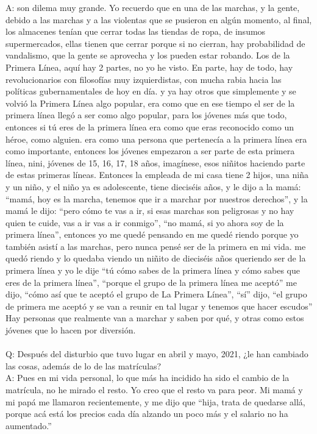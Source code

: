 \documentclass{phyasgn}\usepackage{nag}
\begin{document}
A: son dilema muy grande. Yo recuerdo que en una de las marchas, y la gente, debido a las marchas y a las violentas que se pusieron en algún momento, al final, los almacenes tenían que cerrar todas las tiendas de ropa, de insumos supermercados, ellas tienen que cerrar porque si no cierran, hay probabilidad de vandalismo, que la gente se aprovecha y los pueden estar robando. Los de la Primera Línea, aquí hay 2 partes, no yo he visto. En parte, hay de todo, hay revolucionarios con filosofías muy izquierdistas, con mucha rabia hacia las políticas gubernamentales de hoy en día. y ya hay otros que simplemente y se volvió la Primera Línea algo popular, era como que en ese tiempo el ser de la primera línea llegó a ser como algo popular, para los jóvenes más que todo, entonces si tú eres de la primera línea era como que eras reconocido como un héroe, como alguien. era como una persona que pertenecía a la primera línea era como importante, entonces los jóvenes empezaron a ser parte de esta primera línea, nini, jóvenes de 15, 16, 17, 18 años, imagínese, esos niñitos haciendo parte de estas primeras líneas. Entonces la empleada de mi casa tiene 2 hijos, una niña y un niño, y el niño ya es adolescente, tiene dieciséis años, y le dijo a la mamá: “mamá, hoy es la marcha, tenemos que ir a marchar por nuestros derechos”, y la mamá le dijo: “pero cómo te vas a ir, si esas marchas son peligrosas y no hay quien te cuide, vas a ir vas a ir conmigo”, “no mamá, si yo ahora soy de la primera línea”, entonces yo me quedé pensando en me quedé riendo porque yo también asistí a las marchas, pero nunca pensé ser de la primera en mi vida. me quedó riendo y lo quedaba viendo un niñito de dieciséis años queriendo ser de la primera línea y yo le dije “tú cómo sabes de la primera línea y cómo sabes que eres de la primera línea”, “porque el grupo de la primera línea me aceptó” me dijo, “cómo así que te aceptó el grupo de La Primera Línea”, “sí” dijo, “el grupo de primera me aceptó y se van a reunir en tal lugar y tenemos que hacer escudos” Hay personas que realmente van a marchar y saben por qué, y otras como estos jóvenes que lo hacen por diversión.\\
\\
Q: Después del disturbio que tuvo lugar en abril y mayo, 2021, ¿le han cambiado las cosas, además de lo de las matrículas? \\
	A: Pues en mi vida personal, lo que más ha incidido ha sido el cambio de la matrícula, no he mirado el resto. Yo creo que el resto va para peor. Mi mamá y mi papá me llamaron recientemente, y me dijo que “hija, trata de quedarse allá, porque acá está los precios cada día alzando un poco más y el salario no ha aumentado.”\\
\end{document}
